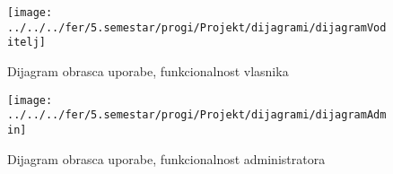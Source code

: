 \begin{figure}
	\centering
	\texttt{[image: ../../../fer/5.semestar/progi/Projekt/dijagrami/dijagramVoditelj]}
	\caption{Dijagram obrasca uporabe, funkcionalnost vlasnika}
	\label{fig:dijagramvoditelj}
\end{figure}

\begin{figure}
	\centering
	\texttt{[image: ../../../fer/5.semestar/progi/Projekt/dijagrami/dijagramAdmin]}
	\caption{Dijagram obrasca uporabe, funkcionalnost administratora}
	\label{fig:dijagramadmin}
\end{figure}





	
